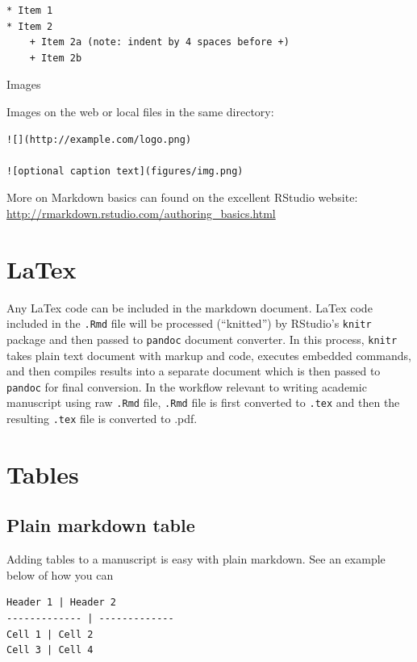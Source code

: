\documentclass[]{book}
\begin{document}
\begin{verbatim}
* Item 1
* Item 2
    + Item 2a (note: indent by 4 spaces before +)
    + Item 2b
\end{verbatim}

Images

Images on the web or local files in the same directory:

\begin{verbatim}
![](http://example.com/logo.png)

![optional caption text](figures/img.png)
\end{verbatim}

More on Markdown basics can found on the excellent RStudio website:
\url{http://rmarkdown.rstudio.com/authoring_basics.html}

\section{LaTex}\label{latex}

Any LaTex code can be included in the markdown document. LaTex code
included in the \texttt{.Rmd} file will be processed (``knitted'') by
RStudio's \texttt{knitr} package and then passed to \texttt{pandoc}
document converter. In this process, \texttt{knitr} takes plain text
document with markup and code, executes embedded commands, and then
compiles results into a separate document which is then passed to
\texttt{pandoc} for final conversion. In the workflow relevant to
writing academic manuscript using raw \texttt{.Rmd} file, \texttt{.Rmd}
file is first converted to \texttt{.tex} and then the resulting
\texttt{.tex} file is converted to .pdf.

\section{Tables}\label{tables}

\subsection{Plain markdown table}\label{plain-markdown-table}

Adding tables to a manuscript is easy with plain markdown. See an
example below of how you can

\begin{verbatim}
Header 1 | Header 2
------------- | -------------
Cell 1 | Cell 2
Cell 3 | Cell 4
\end{verbatim}
\end{document}
